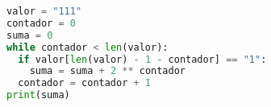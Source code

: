 
\question 
\begin{lstlisting}[language=Python]
valor = "111"
contador = 0
suma = 0
while contador < len(valor):
  if valor[len(valor) - 1 - contador] == "1":
    suma = suma + 2 ** contador
  contador = contador + 1
print(suma)
\end{lstlisting}
